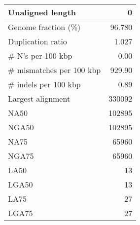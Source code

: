 \documentclass[12pt,a4paper]{article}
\begin{document}
\begin{table}[ht]
\begin{center}
\begin{tabular}{|l*{1}{|r}|}
Unaligned length & 0 \\ \hline
Genome fraction (\%) & 96.780 \\ \hline
Duplication ratio & 1.027 \\ \hline
\# N's per 100 kbp & 0.00 \\ \hline
\# mismatches per 100 kbp & 929.90 \\ \hline
\# indels per 100 kbp & 0.89 \\ \hline
Largest alignment & 330092 \\ \hline
NA50 & 102895 \\ \hline
NGA50 & 102895 \\ \hline
NA75 & 65960 \\ \hline
NGA75 & 65960 \\ \hline
LA50 & 13 \\ \hline
LGA50 & 13 \\ \hline
LA75 & 27 \\ \hline
LGA75 & 27 \\ \hline
\end{tabular}
\end{center}
\end{table}
\end{document}
